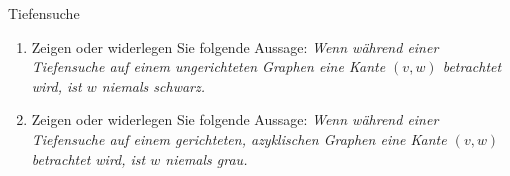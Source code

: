 \documentclass[11pt,a4paper]{article}
\begin{document}
\thispagestyle{empty}
\DeclareRobustCommand{\ttfamily}{\fontencoding{T1}\fontfamily{lmtt}\selectfont}

\newcommand{\quotes}[1]{\glqq{}#1\grqq{}}




\begin{aufgabe}{1}{Tiefensuche}
    \begin{enumerate}
        \item Zeigen oder widerlegen Sie folgende Aussage:
        \emph{Wenn während einer Tiefensuche auf einem ungerichteten Graphen eine Kante $(v, w)$ betrachtet wird, ist $w$ niemals schwarz.}
        \item Zeigen oder widerlegen Sie folgende Aussage:
        \emph{Wenn während einer Tiefensuche auf einem gerichteten, azyklischen Graphen eine Kante $(v, w)$ betrachtet wird, ist $w$ niemals grau.}
    \end{enumerate}
\end{aufgabe}
\end{document}
